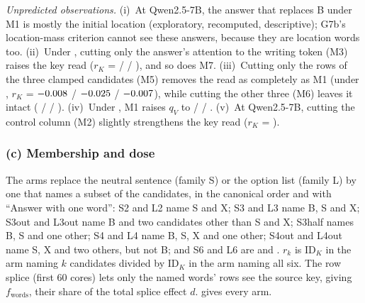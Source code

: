 \emph{Unpredicted observations.} (i)~At Qwen2.5-7B, the answer that replaces B under M1 is mostly the initial location (exploratory, recomputed, descriptive); G7b's location-mass criterion cannot see these answers, because they are location words too. (ii)~Under \fmtPost{}, cutting only the answer's attention to the writing token (M3) raises the key read ($r_K$ = \GbRKPostMthreeQwenSeven{} / \GbRKPostMthreeQwenFourteen{} / \GbRKPostMthreeMistralSeven{}), and so does M7. (iii)~Cutting only the rows of the three clamped candidates (M5) removes the read as completely as M1 (under \fmtListA{}, $r_K$ = $-0.008$ / $-0.025$ / $-0.007$), while cutting the other three (M6) leaves it intact (\GbRKAfterMsixQwenSeven{} / \GbRKAfterMsixQwenFourteen{} / \GbRKAfterMsixMistralSeven{}). (iv)~Under \fmtPost{}, M1 raises $q_V$ to \GbQVPostMoneQwenSeven{} / \GbQVPostMoneQwenFourteen{} / \GbQVPostMoneMistralSeven{}. (v)~At Qwen2.5-7B, cutting the control column (M2) slightly strengthens the key read ($r_K$ = \GsixRKQwenSeven{}).

\subsubsection{(c) Membership and dose}\label{app:g-membership}

The arms replace the neutral sentence (family S) or the option list (family L) by one that names a subset of the candidates, in the canonical order and with ``Answer with one word'': S2 and L2 name S and X; S3 and L3 name B, S and X; S3out and L3out name B and two candidates other than S and X; S3half names B, S and one other; S4 and L4 name B, S, X and one other; S4out and L4out name S, X and two others, but not B; and S6 and L6 are \fmtPost{} and \fmtListA{}. $r_k$ is $\mathrm{ID}_K$ in the arm naming $k$ candidates divided by $\mathrm{ID}_K$ in the arm naming all six. The row splice (first 60 cores) lets only the named words' rows see the source key, giving $f_{\mathrm{words}}$, their share of the total splice effect $d$.  gives every arm.

\begin{table}[!ht]
\centering
\small
\caption{\textbf{Membership and dose} (preregistration G, part (c)). Top: $\mathrm{ID}_K$ and $\mathrm{ID}_V$ (nats) per arm, seed-0 cores, $n = 150$. Bottom: row splice ($n = 60$), the share of the total key-swap effect $d$ read by the named words' rows ($f_{\mathrm{words}}$) and by the rows after the question. Qwen2.5-7B, Qwen2.5-14B and Mistral-7B enter G9--G12; OLMo-2-7B and the arms S3half, S4, S4out, L4, L4out, S6, L6 (as splice arms) and S3out, L3out (as splice arms) are exploratory.}
\label{tab:membership}

\end{table}

